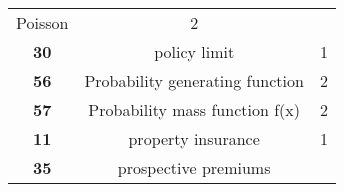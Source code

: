 \documentclass[]{book}
\theoremstyle{definition}
\theoremstyle{definition}
\theoremstyle{definition}
\theoremstyle{remark}
\begin{document}
\begin{longtable}[]{@{}ccc@{}}
\begin{minipage}[t]{0.42\columnwidth}
Poisson\strut
\end{minipage} & \begin{minipage}[t]{0.29\columnwidth}\centering\strut
2\strut
\end{minipage}\tabularnewline
\begin{minipage}[t]{0.11\columnwidth}\centering\strut
\textbf{30}\strut
\end{minipage} & \begin{minipage}[t]{0.42\columnwidth}\centering\strut
policy limit\strut
\end{minipage} & \begin{minipage}[t]{0.29\columnwidth}\centering\strut
1\strut
\end{minipage}\tabularnewline
\begin{minipage}[t]{0.11\columnwidth}\centering\strut
\textbf{56}\strut
\end{minipage} & \begin{minipage}[t]{0.42\columnwidth}\centering\strut
Probability generating function\strut
\end{minipage} & \begin{minipage}[t]{0.29\columnwidth}\centering\strut
2\strut
\end{minipage}\tabularnewline
\begin{minipage}[t]{0.11\columnwidth}\centering\strut
\textbf{57}\strut
\end{minipage} & \begin{minipage}[t]{0.42\columnwidth}\centering\strut
Probability mass function f(x)\strut
\end{minipage} & \begin{minipage}[t]{0.29\columnwidth}\centering\strut
2\strut
\end{minipage}\tabularnewline
\begin{minipage}[t]{0.11\columnwidth}\centering\strut
\textbf{11}\strut
\end{minipage} & \begin{minipage}[t]{0.42\columnwidth}\centering\strut
property insurance\strut
\end{minipage} & \begin{minipage}[t]{0.29\columnwidth}\centering\strut
1\strut
\end{minipage}\tabularnewline
\begin{minipage}[t]{0.11\columnwidth}\centering\strut
\textbf{35}\strut
\end{minipage} & \begin{minipage}[t]{0.42\columnwidth}\centering\strut
prospective premiums\strut

\end{minipage}
\end{longtable}
\end{document}
